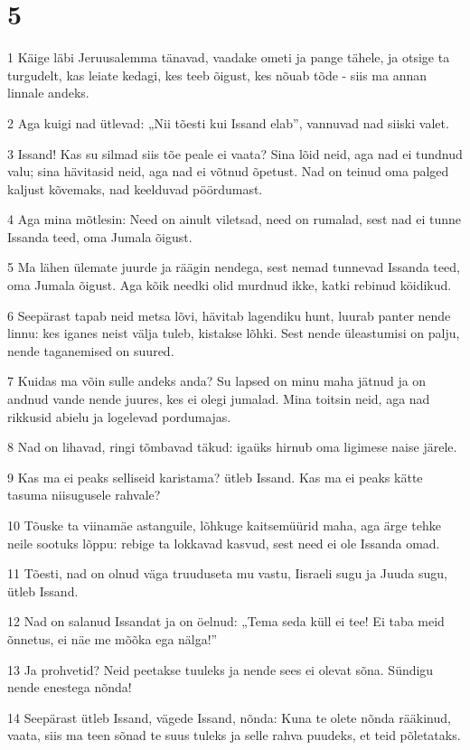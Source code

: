 \chapter{5}

\par 1 Käige läbi Jeruusalemma tänavad, vaadake ometi ja pange tähele, ja otsige ta turgudelt, kas leiate kedagi, kes teeb õigust, kes nõuab tõde - siis ma annan linnale andeks.
\par 2 Aga kuigi nad ütlevad: „Nii tõesti kui Issand elab”, vannuvad nad siiski valet.
\par 3 Issand! Kas su silmad siis tõe peale ei vaata? Sina lõid neid, aga nad ei tundnud valu; sina hävitasid neid, aga nad ei võtnud õpetust. Nad on teinud oma palged kaljust kõvemaks, nad keelduvad pöördumast.
\par 4 Aga mina mõtlesin: Need on ainult viletsad, need on rumalad, sest nad ei tunne Issanda teed, oma Jumala õigust.
\par 5 Ma lähen ülemate juurde ja räägin nendega, sest nemad tunnevad Issanda teed, oma Jumala õigust. Aga kõik needki olid murdnud ikke, katki rebinud köidikud.
\par 6 Seepärast tapab neid metsa lõvi, hävitab lagendiku hunt, luurab panter nende linnu: kes iganes neist välja tuleb, kistakse lõhki. Sest nende üleastumisi on palju, nende taganemised on suured.
\par 7 Kuidas ma võin sulle andeks anda? Su lapsed on minu maha jätnud ja on andnud vande nende juures, kes ei olegi jumalad. Mina toitsin neid, aga nad rikkusid abielu ja logelevad pordumajas.
\par 8 Nad on lihavad, ringi tõmbavad täkud: igaüks hirnub oma ligimese naise järele.
\par 9 Kas ma ei peaks selliseid karistama? ütleb Issand. Kas ma ei peaks kätte tasuma niisugusele rahvale?
\par 10 Tõuske ta viinamäe astanguile, lõhkuge kaitsemüürid maha, aga ärge tehke neile sootuks lõppu: rebige ta lokkavad kasvud, sest need ei ole Issanda omad.
\par 11 Tõesti, nad on olnud väga truuduseta mu vastu, Iisraeli sugu ja Juuda sugu, ütleb Issand.
\par 12 Nad on salanud Issandat ja on öelnud: „Tema seda küll ei tee! Ei taba meid õnnetus, ei näe me mõõka ega nälga!”
\par 13 Ja prohvetid? Neid peetakse tuuleks ja nende sees ei olevat sõna. Sündigu nende enestega nõnda!
\par 14 Seepärast ütleb Issand, vägede Issand, nõnda: Kuna te olete nõnda rääkinud, vaata, siis ma teen sõnad te suus tuleks ja selle rahva puudeks, et teid põletataks.
